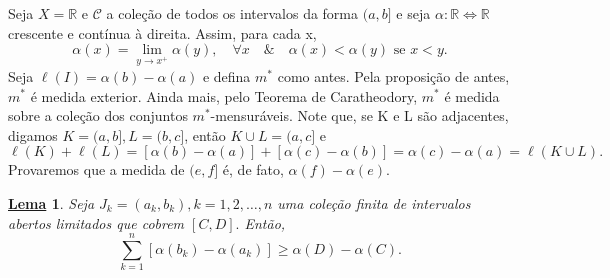 \documentclass{article}
\newtheorem*{lemma*}{\underline{Lema}}
\begin{document}
Seja \(X = \mathbb{R}\) e \(\mathcal{C}\) a coleção de todos os intervalos da forma \((a, b]\) e seja \(\alpha: \mathbb{R}\Longleftrightarrow \mathbb{R}\) crescente e contínua à direita. Assim, para cada x,
\[
	\alpha (x) = \lim_{y\to x^{+}}\alpha (y),\quad \forall x \quad\&\quad \alpha (x) < \alpha (y)\text{ se }x < y.
\]
Seja \(\ell (I) = \alpha (b) - \alpha (a)\) e defina \(m^{*}\) como antes. Pela proposição de antes, \(m^{*}\) é medida exterior. Ainda mais, pelo Teorema de Caratheodory, \(m^{*}\) é medida sobre
a coleção dos conjuntos \(m^{*}\)-mensuráveis. Note que, se K e L são adjacentes, digamos \(K = (a, b], L = (b, c]\), então \(K\cup L = (a, c]\) e
\[
	\ell (K) + \ell (L) = [\alpha (b) - \alpha (a)] + [\alpha (c) - \alpha (b)] = \alpha (c) - \alpha (a) = \ell (K\cup L).
\]
Provaremos que a medida de \((e, f]\) é, de fato, \(\alpha (f) - \alpha (e).\)
\begin{lemma*}
	Seja \(J_{k} = (a_{k}, b_{k}), k = 1, 2, \dotsc , n\) uma coleção finita de intervalos abertos limitados que cobrem \([C, D].\) Então,
	\[
		\sum\limits_{k=1}^{n}[\alpha (b_{k}) - \alpha (a_{k})] \geq \alpha (D) - \alpha (C).
	\]
\end{lemma*}
\end{document}
